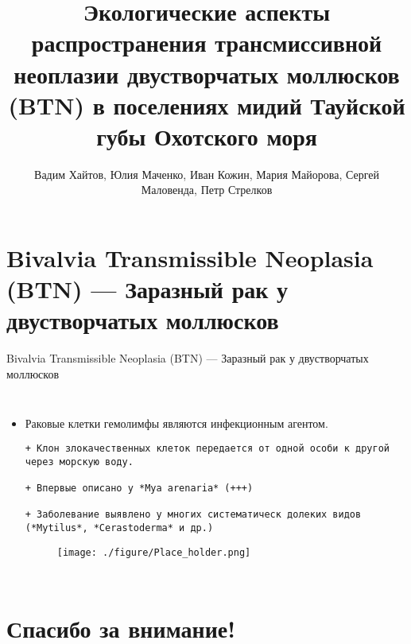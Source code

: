 \documentclass[
  ignorenonframetext,
]{beamer}
\title{Экологические аспекты распространения трансмиссивной неоплазии
двустворчатых моллюсков (BTN) в поселениях мидий Тауйской губы Охотского
моря}
\author{Вадим Хайтов, Юлия Маченко, Иван Кожин, Мария Майорова, Сергей
Маловенда, Петр Стрелков}
\date{}
\newcommand{\columnsbegin}{\begin{columns}}
\newcommand{\columnsend}{\end{columns}}
\begin{document}
\frame{\titlepage}

\section{Bivalvia Transmissible Neoplasia (BTN) --- Заразный рак у
двустворчатых
моллюсков}\label{bivalvia-transmissible-neoplasia-btn-ux437ux430ux440ux430ux437ux43dux44bux439-ux440ux430ux43a-ux443-ux434ux432ux443ux441ux442ux432ux43eux440ux447ux430ux442ux44bux445-ux43cux43eux43bux43bux44eux441ux43aux43eux432}

\begin{frame}[fragile]{Bivalvia Transmissible Neoplasia (BTN) ---
Заразный рак у двустворчатых моллюсков}
\columnsbegin

\begin{itemize}
\item
  Раковые клетки гемолимфы являются инфекционным агентом.

\begin{verbatim}
+ Клон злокачественных клеток передается от одной особи к другой через морскую воду.

+ Впервые описано у *Mya arenaria* (+++)

+ Заболевание выявлено у многих систематическ долеких видов (*Mytilus*, *Cerastoderma* и др.)
\end{verbatim}


  \begin{figure}
      \centering
          \texttt{[image: ./figure/Place\_holder.png]}

  \end{figure}
\end{itemize}

\columnsend
\end{frame}

\section{Спасибо за
внимание!}\label{ux441ux43fux430ux441ux438ux431ux43e-ux437ux430-ux432ux43dux438ux43cux430ux43dux438ux435}
\end{document}

